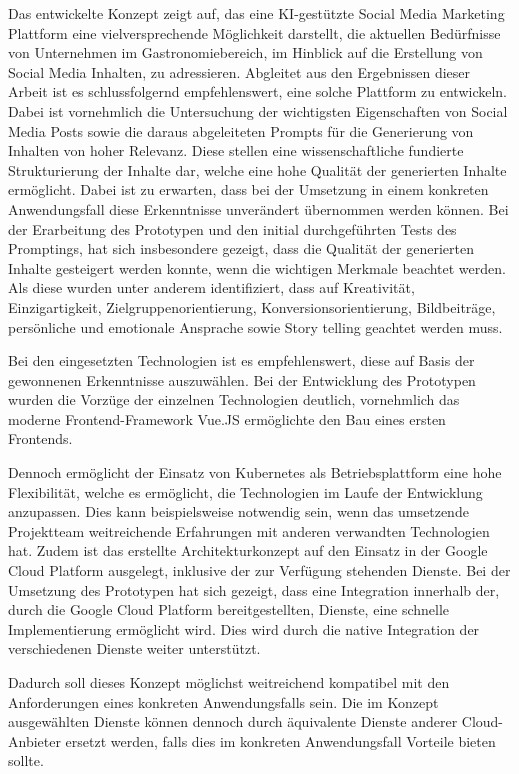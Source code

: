 Das entwickelte Konzept zeigt auf, das eine KI-gestützte Social Media Marketing Plattform eine vielversprechende Möglichkeit darstellt, die aktuellen Bedürfnisse von Unternehmen im Gastronomiebereich, im Hinblick auf die Erstellung von Social Media Inhalten, zu adressieren.
Abgleitet aus den Ergebnissen dieser Arbeit ist es schlussfolgernd empfehlenswert, eine solche Plattform zu entwickeln.
Dabei ist vornehmlich die Untersuchung der wichtigsten Eigenschaften von Social Media Posts sowie die daraus abgeleiteten Prompts für die Generierung von Inhalten von hoher Relevanz.
Diese stellen eine wissenschaftliche fundierte Strukturierung der Inhalte dar, welche eine hohe Qualität der generierten Inhalte ermöglicht.%
Dabei ist zu erwarten, dass bei der Umsetzung in einem konkreten Anwendungsfall diese Erkenntnisse unverändert übernommen werden können.
Bei der Erarbeitung des Prototypen und den initial durchgeführten Tests des Promptings, hat sich insbesondere gezeigt, dass die Qualität der generierten Inhalte gesteigert werden konnte, wenn die wichtigen Merkmale beachtet werden.
Als diese wurden unter anderem identifiziert, dass auf Kreativität, Einzigartigkeit, Zielgruppenorientierung, Konversionsorientierung, Bildbeiträge, persönliche und emotionale Ansprache sowie Story telling geachtet werden muss.

Bei den eingesetzten Technologien ist es empfehlenswert, diese auf Basis der gewonnenen Erkenntnisse auszuwählen.
Bei der Entwicklung des Prototypen wurden die Vorzüge der einzelnen Technologien deutlich, vornehmlich das moderne Frontend-Framework Vue.JS ermöglichte den Bau eines ersten Frontends.

Dennoch ermöglicht der Einsatz von Kubernetes als Betriebsplattform eine hohe Flexibilität, welche es ermöglicht, die Technologien im Laufe der Entwicklung anzupassen.
Dies kann beispielsweise notwendig sein, wenn das umsetzende Projektteam weitreichende Erfahrungen mit anderen verwandten Technologien hat.
Zudem ist das erstellte Architekturkonzept auf den Einsatz in der Google Cloud Platform ausgelegt, inklusive der zur Verfügung stehenden Dienste.
Bei der Umsetzung des Prototypen hat sich gezeigt, dass eine Integration innerhalb der, durch die Google Cloud Platform bereitgestellten, Dienste, eine schnelle Implementierung ermöglicht wird.
Dies wird durch die native Integration der verschiedenen Dienste weiter unterstützt.

Dadurch soll dieses Konzept möglichst weitreichend kompatibel mit den Anforderungen eines konkreten Anwendungsfalls sein.
Die im Konzept ausgewählten Dienste können dennoch durch äquivalente Dienste anderer Cloud-Anbieter ersetzt werden, falls dies im konkreten Anwendungsfall Vorteile bieten sollte.

